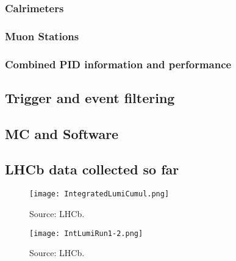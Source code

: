 \subsubsection{Calrimeters}
\subsubsection{Muon Stations}
\subsubsection{Combined PID information and performance}

\subsection{Trigger and event filtering}

\subsection{MC and Software}

\subsection{LHCb data collected so far}

\begin{figure}[tb] 
  \centering    
  \texttt{[image: IntegratedLumiCumul.png]}
  \caption{Source: LHCb.}
  \label{fig:cumulative_lumi}
\end{figure}

\begin{figure}[tb] 
  \centering    
  \texttt{[image: IntLumiRun1-2.png]}
  \caption{Source: LHCb.}
  \label{fig:yearly_lumi}
\end{figure}
